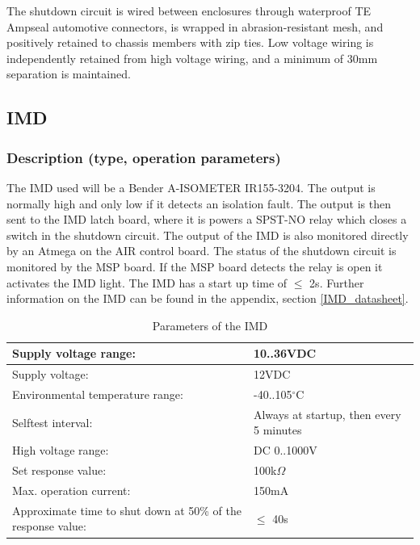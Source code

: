 \documentclass{article}
\begin{document}
The shutdown circuit is wired between enclosures through waterproof TE Ampseal automotive connectors, is wrapped in abrasion-resistant mesh, and positively retained to chassis members with zip ties. Low voltage wiring is independently retained from high voltage wiring, and a minimum of 30mm separation is maintained. 


\subsection{IMD}\label{imd}
\subsubsection{Description (type, operation parameters)}%

The IMD used will be a Bender A-ISOMETER IR155-3204. The output is normally high and only low if it detects an isolation fault. The output is then sent to the IMD latch board, where it is powers a SPST-NO relay which closes a switch in the shutdown circuit. The output of the IMD is also monitored directly by an Atmega on the AIR control board. The status of the shutdown circuit is monitored by the MSP board. If the MSP board detects the relay is  open it activates the IMD light. The IMD has a start up time of $\leq$ 2s. Further information on the IMD can be found in the appendix, section \ref{IMD_datasheet}.






\begin{center}
	\begin{table}[H]
		\begin{tabular}{|l|l|}
			\hline
			Supply voltage range: &  10..36VDC \\
			\hline
			Supply voltage: &  12VDC\\
			\hline
			Environmental temperature range: &  -40..105$^{\circ}$C \\
			\hline
			Selftest interval: &  Always at startup, then every 5 minutes \\
			\hline
			High voltage range: &  DC 0..1000V \\
			\hline
			Set response value: &  100k$\Omega$ \\
			\hline
			Max. operation current: &  150mA \\
			\hline
			Approximate time to shut down at 50\% of the response value:&  $\leq$ 40s \\
			\hline
		\end{tabular}
		\caption{Parameters of the IMD}
		\label{IMDParameters}
	\end{table}
\end{center}
\end{document}
